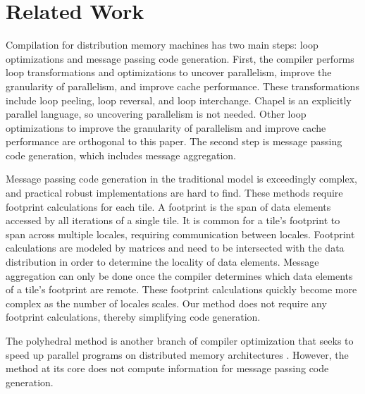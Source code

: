 \section{Related Work}\label{sec:relwork}

Compilation for distribution memory machines has two main steps: loop optimizations and message passing code generation. First, the compiler performs loop transformations and optimizations to uncover parallelism, improve the granularity of parallelism, and improve cache performance. These transformations include loop peeling, loop reversal, and loop interchange. Chapel is an explicitly parallel language, so uncovering parallelism is not needed. Other loop optimizations to improve the granularity of parallelism and improve cache performance are orthogonal to this paper. The second step is message passing code generation, which includes message aggregation.

Message passing code generation in the traditional model is exceedingly complex, and practical robust implementations are hard to find. These methods \cite{goumas2006message, xue1997communication, callahan1988compiling, ramanujam1991compile} require footprint calculations for each tile. A footprint is the span of data elements accessed by all iterations of a single tile. It is common for a tile's footprint to span across multiple locales, requiring communication between locales. Footprint calculations are modeled by matrices and need to be intersected with the data distribution in order to determine the locality of data elements. Message aggregation can only be done once the compiler determines which data elements of a tile's footprint are remote. These footprint calculations quickly become more complex as the number of locales scales. Our method does not require any footprint calculations, thereby simplifying code generation. 

The polyhedral method is another branch of compiler optimization that seeks to speed up parallel programs on distributed memory architectures \cite{chavarria2005effective, germain1995automatic, Gupta91automaticdata, gupta1996compiling, iancu2008performance, wei1998compiling}. However, the method at its core does not compute information for message passing code generation. 

